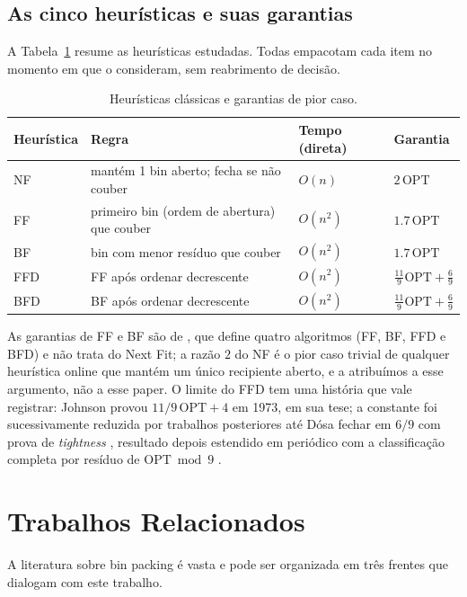 \documentclass[12pt]{article}
\begin{document}
\subsection{As cinco heurísticas e suas garantias}

A Tabela~\ref{tab:garantias} resume as heurísticas estudadas. Todas empacotam cada item no momento em que o consideram, sem reabrimento de decisão.

\begin{table}[ht]
\centering
\caption{Heurísticas clássicas e garantias de pior caso.}
\label{tab:garantias}
\footnotesize
\begin{tabular}{llll}
\hline
Heurística & Regra & Tempo (direta) & Garantia \\
\hline
NF & mantém 1 bin aberto; fecha se não couber & $O(n)$ & $2\,\mathrm{OPT}$ \\
FF & primeiro bin (ordem de abertura) que couber & $O(n^2)$ & $1.7\,\mathrm{OPT}$ \\
BF & bin com menor resíduo que couber & $O(n^2)$ & $1.7\,\mathrm{OPT}$ \\
FFD & FF após ordenar decrescente & $O(n^2)$ & $\frac{11}{9}\mathrm{OPT}+\frac{6}{9}$ \\
BFD & BF após ordenar decrescente & $O(n^2)$ & $\frac{11}{9}\mathrm{OPT}+\frac{6}{9}$ \\
\hline
\end{tabular}
\end{table}

As garantias de FF e BF são de \cite{johnson1974}, que define quatro algoritmos (FF, BF, FFD e BFD) e não trata do Next Fit; a razão $2$ do NF é o pior caso trivial de qualquer heurística online que mantém um único recipiente aberto, e a atribuímos a esse argumento, não a esse paper. O limite do FFD tem uma história que vale registrar: Johnson provou $11/9\,\mathrm{OPT}+4$ em 1973, em sua tese; a constante foi sucessivamente reduzida por trabalhos posteriores até Dósa fechar em $6/9$ com prova de \textit{tightness} \cite{dosa2007}, resultado depois estendido em periódico com a classificação completa por resíduo de $\mathrm{OPT} \bmod 9$ \cite{dosa2013}.

\section{Trabalhos Relacionados} \label{sec:trab}

A literatura sobre bin packing é vasta e pode ser organizada em três frentes que dialogam com este trabalho.
\end{document}

